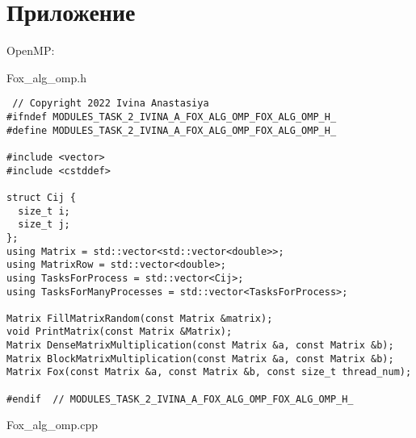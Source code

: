\documentclass{report}
\begin{document}
\section*{Приложение}
 OpenMP:
 \par Fox\_alg\_omp.h
 \begin{lstlisting}
 // Copyright 2022 Ivina Anastasiya
#ifndef MODULES_TASK_2_IVINA_A_FOX_ALG_OMP_FOX_ALG_OMP_H_
#define MODULES_TASK_2_IVINA_A_FOX_ALG_OMP_FOX_ALG_OMP_H_

#include <vector>
#include <cstddef>

struct Cij {
  size_t i;
  size_t j;
};
using Matrix = std::vector<std::vector<double>>;
using MatrixRow = std::vector<double>;
using TasksForProcess = std::vector<Cij>;
using TasksForManyProcesses = std::vector<TasksForProcess>;

Matrix FillMatrixRandom(const Matrix &matrix);
void PrintMatrix(const Matrix &Matrix);
Matrix DenseMatrixMultiplication(const Matrix &a, const Matrix &b);
Matrix BlockMatrixMultiplication(const Matrix &a, const Matrix &b);
Matrix Fox(const Matrix &a, const Matrix &b, const size_t thread_num);

#endif  // MODULES_TASK_2_IVINA_A_FOX_ALG_OMP_FOX_ALG_OMP_H_
 \end{lstlisting}
 Fox\_alg\_omp.cpp
\end{document}
